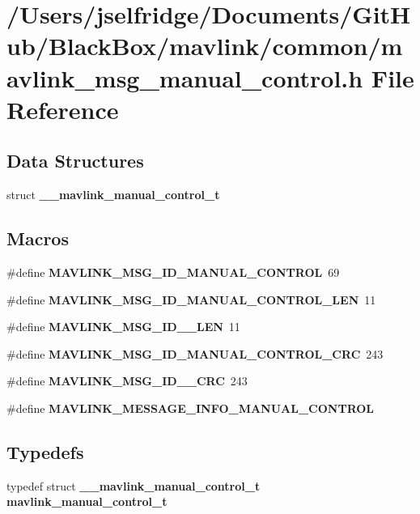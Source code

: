 \section{/\+Users/jselfridge/\+Documents/\+Git\+Hub/\+Black\+Box/mavlink/common/mavlink\+\_\+msg\+\_\+manual\+\_\+control.h File Reference}
\label{mavlink__msg__manual__control_8h}
\subsection*{Data Structures}
\begin{DoxyCompactItemize}
\item 
struct \textbf{ \+\_\+\+\_\+mavlink\+\_\+manual\+\_\+control\+\_\+t}
\end{DoxyCompactItemize}
\subsection*{Macros}
\begin{DoxyCompactItemize}
\item 
\#define \textbf{ M\+A\+V\+L\+I\+N\+K\+\_\+\+M\+S\+G\+\_\+\+I\+D\+\_\+\+M\+A\+N\+U\+A\+L\+\_\+\+C\+O\+N\+T\+R\+OL}~69
\item 
\#define \textbf{ M\+A\+V\+L\+I\+N\+K\+\_\+\+M\+S\+G\+\_\+\+I\+D\+\_\+\+M\+A\+N\+U\+A\+L\+\_\+\+C\+O\+N\+T\+R\+O\+L\+\_\+\+L\+EN}~11
\item 
\#define \textbf{ M\+A\+V\+L\+I\+N\+K\+\_\+\+M\+S\+G\+\_\+\+I\+D\+\_\+\_\+\+L\+EN}~11
\item 
\#define \textbf{ M\+A\+V\+L\+I\+N\+K\+\_\+\+M\+S\+G\+\_\+\+I\+D\+\_\+\+M\+A\+N\+U\+A\+L\+\_\+\+C\+O\+N\+T\+R\+O\+L\+\_\+\+C\+RC}~243
\item 
\#define \textbf{ M\+A\+V\+L\+I\+N\+K\+\_\+\+M\+S\+G\+\_\+\+I\+D\+\_\+\_\+\+C\+RC}~243
\item 
\#define \textbf{ M\+A\+V\+L\+I\+N\+K\+\_\+\+M\+E\+S\+S\+A\+G\+E\+\_\+\+I\+N\+F\+O\+\_\+\+M\+A\+N\+U\+A\+L\+\_\+\+C\+O\+N\+T\+R\+OL}
\end{DoxyCompactItemize}
\subsection*{Typedefs}
\begin{DoxyCompactItemize}
\item 
typedef struct \textbf{ \+\_\+\+\_\+mavlink\+\_\+manual\+\_\+control\+\_\+t} \textbf{ mavlink\+\_\+manual\+\_\+control\+\_\+t}
\end{DoxyCompactItemize}


